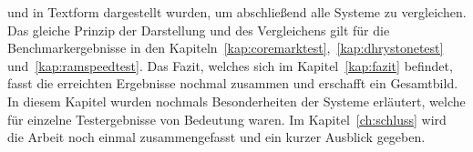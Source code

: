und in Textform dargestellt wurden, um abschließend alle Systeme zu vergleichen.\\
Das gleiche Prinzip der Darstellung und des Vergleichens gilt für die Benchmarkergebnisse in den Kapiteln~\ref{kap:coremarktest},~\ref{kap:dhrystonetest} und~\ref{kap:ramspeedtest}.
Das Fazit, welches sich im Kapitel~\ref{kap:fazit} befindet, fasst die erreichten Ergebnisse nochmal zusammen und erschafft ein Gesamtbild. In diesem Kapitel wurden nochmals Besonderheiten der
Systeme erläutert, welche für einzelne Testergebnisse von Bedeutung waren.
Im Kapitel~\ref{ch:schluss} wird die Arbeit noch einmal zusammengefasst und ein kurzer Ausblick gegeben.\\
